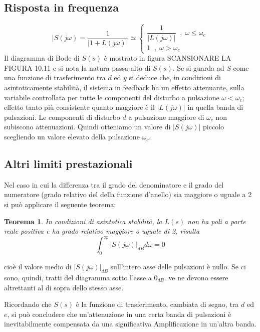 \documentclass[a4paper]{report}
\newtheorem{teorema}{Teorema}
\begin{document}
\subsection{Risposta in frequenza}
\[
|S(j \omega) = \dfrac{1}{|1 + L(j \omega)|} \simeq
\left\{
\begin{array}{l}
  \dfrac{1}{|L(j \omega)|} \;\;,\; \omega \leq \omega_c\\
  1 \;\;,\; \omega > \omega_c
\end{array}
\right.
\]
Il diagramma di Bode di $S(s)$ \`e mostrato in figura SCANSIONARE LA
FIGURA 10.11 e si nota la natura passa-alto di $S(s)$. Se si guarda ad
$S$ come una funzione di trasferimento tra $d$ ed $y$ si deduce che,
in condizioni di asintoticamente stabilit\`a, il sistema in feedback
ha un effetto attenuante, sulla variabile controllata per tutte le
componenti del disturbo a pulsazione $\omega < \omega_c$; effetto
tanto pi\`u consistente quanto maggiore \`e il $|L(j \omega)|$ in
quella banda di pulsazioni. Le componenti di disturbo $d$ a pulsazione
maggiore di $\omega_c$ non subiscono attenuazioni. Quindi otteniamo un
valore di $|S(j \omega)|$ piccolo scegliendo un valore elevato della
pulsazione $\omega_c$. 
\subsection{Altri limiti prestazionali}
Nel caso in cui la differenza tra il grado del denominatore e il grado
del numeratore (grado relativo del della funzione d'anello) sia
maggiore o uguale a 2 si pu\`o applicare il seguente teorema:
\begin{teorema}
  In condizioni di asintotica stabilit\`a, la $L(s)$ non ha poli a
  parte reale positiva e ha grado relativo maggiore o uguale di 2,
  risulta
  \[
  \int_{0}^{\infty} |S(j \omega)|_{dB} d\omega = 0
  \]
\end{teorema}
cio\`e il valore medio di $|S(j \omega)|_{dB}$ sull'intero asse delle
pulsazioni \`e nullo. Se ci sono, quindi, tratti del diagramma sotto
l'asse a $0_{dB}$. ve ne devono essere altrettanti al di sopra dello
stesso asse.

Ricordando che $S(s)$ \`e la funzione di trasferimento, cambiata di
segno, tra $d$ ed $e$, si pu\`o concludere che un'attenuzione in una
certa banda di pulsazioni \`e inevitabilmente compensata da una
significativa Amplificazione in un'altra banda.
\end{document}
